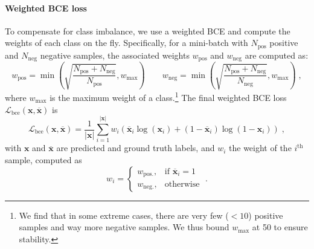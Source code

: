 \paragraph{Weighted BCE loss}
To compensate for class imbalance, we use a weighted BCE and compute the weights of each class on the fly. Specifically, for a mini-batch with $N_{\text{pos}}$ positive and $N_{\text{neg}}$ negative samples, the associated weights $w_{\text{pos}}$ and $w_{\text{neg}}$ are computed as:
\begin{equation}
    w_{\text{pos}} = \min(\sqrt{\frac{N_{\text{pos}} + N_{\text{neg}}}{N_{\text{pos}}}}, w_{\text{max}}) \qquad 
    w_{\text{neg}} = \min(\sqrt{\frac{N_{\text{pos}} + N_{\text{neg}}}{N_{\text{neg}}}}, w_{\text{max}})\;,
\end{equation}
where $w_{\text{max}}$ is the maximum weight of a class.\footnote{We find that in some extreme cases, there are very few ($<10$) positive samples and way more negative samples. We thus bound $w_{\text{max}}$ at 50 to ensure stability.} The final weighted BCE loss $\mathcal{L}_{\mathrm{bce}}(\mathbf{x}, \overline{\mathbf{x}})$ is 
\begin{equation}
\mathcal{L}_{\mathrm{bce}}(\mathbf{x}, \overline{\mathbf{x}}) \!= \frac{1}{|\mathbf{x}|} \sum_{i=1}^{|\mathbf{x}|} w_i (\overline{\mathbf{x}}_i \log(\mathbf{x}_i) + (1 - \overline{\mathbf{x}}_i) \log (1 - \mathbf{x}_i))\;,
\end{equation}
with $\mathbf{x}$ and $\overline{\mathbf{x}}$ are predicted and ground truth labels, and $w_i$ the weight of the $i^\text{th}$ sample, computed as
\begin{equation}
    w_i =      
    \begin{cases}
      w_{\text{pos.}}, & \text{if } \overline{\mathbf{x}}_i = 1  \\
      w_{\text{neg.}}, & \text{otherwise}
    \end{cases}\;.
\end{equation}


